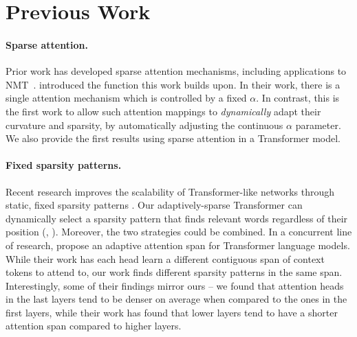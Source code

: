 \section{Previous Work}

\paragraph*{Sparse attention.}
Prior work has developed sparse attention mechanisms, including
applications to NMT~\citep{sparsemax, malaviya2018sparse, fusedmax,
    shao2019ssn, maruf2019selective}. \citet{entmax} introduced the
\entmaxtext function this work builds upon. In their work, there is a
single attention mechanism which is controlled by a fixed $\alpha$.
In contrast, this is the first work to allow such attention mappings
to \emph{dynamically} adapt their curvature and sparsity, by
automatically adjusting the continuous $\alpha$ parameter. We also
provide the first results using sparse attention in a Transformer
model.

\paragraph*{Fixed sparsity patterns.}
Recent research improves the scalability of Transformer-like networks
through static, fixed sparsity patterns
\citep{openai_sparse_transf,dynamic_conv}. Our adaptively-sparse
Transformer can dynamically select a sparsity pattern that finds
relevant words regardless of their position (\eg,
). Moreover, the two strategies could be
combined. In a concurrent line of research, \citet{Sukhbaatar2019}
propose an adaptive attention span for Transformer language models.
While their work has each head learn a different contiguous span of
context tokens to attend to, our work finds different sparsity
patterns in the same span. Interestingly, some of their findings
mirror ours -- we found that attention heads in the last layers tend
to be denser on average when compared to the ones in the first
layers, while their work has found that lower layers tend to have a
shorter attention span compared to higher layers.

